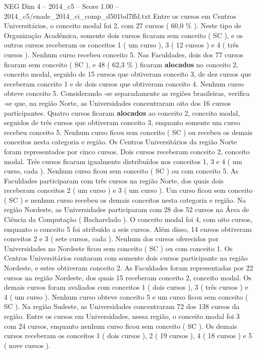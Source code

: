 \begin{textsample}{NEG Dim 4 – 2014\_c5 – Score 1.00 – 2014\_c5/enade\_2014\_ci\_comp\_d501bd7ffd.txt}
Entre os cursos em Centros Universitários, o conceito modal foi 2, com 27 cursos ( 60,0 \% ).
Neste tipo de Organização Acadêmica, somente dois cursos ficaram sem conceito ( SC ), e os outros cursos receberam os conceitos 1 ( um curso ), 3 ( 12 cursos ) e 4 ( três cursos ).
Nenhum curso recebeu conceito 5.
Nas Faculdades, dois dos 77 cursos ficaram sem conceito ( SC ), e 48 ( 62,3 \% ) ficaram \textbf{alocados} no conceito 2, conceito modal, seguido de 15 cursos que obtiveram conceito 3, de dez cursos que receberam conceito 1 e de dois cursos que obtiveram conceito 4.
Nenhum curso obteve conceito 5.
Considerando -se separadamente as regiões brasileiras, verifica -se que, na região Norte, as Universidades concentraram oito dos 16 cursos participantes.
Quatro cursos ficaram \textbf{alocados} ao conceito 2, conceito modal, seguidos de três cursos que obtiveram conceito 3, enquanto somente um curso recebeu conceito 5.
Nenhum curso ficou sem conceito ( SC ) ou recebeu os demais conceitos nesta categoria e região.
Os Centros Universitários da região Norte foram representados por cinco cursos.
Dois cursos receberam conceito 2, conceito modal.
Três cursos ficaram igualmente distribuídos nos conceitos 1, 3 e 4 ( um curso, cada ).
Nenhum curso ficou sem conceito ( SC ) ou com conceito 5.
As Faculdades participaram com três cursos na região Norte, dos quais dois receberam conceitos 2 ( um curso ) e 3 ( um curso ).
Um curso ficou sem conceito ( SC ) e nenhum curso recebeu os demais conceitos nesta categoria e região.
Na região Nordeste, as Universidades participaram com 28 dos 52 cursos na Área de Ciência da Computação ( Bacharelado ).
O conceito modal foi 4, com oito cursos, enquanto o conceito 5 foi atribuído a seis cursos.
Além disso, 14 cursos obtiveram conceitos 2 e 3 ( sete cursos, cada ).
Nenhum dos cursos oferecidos por Universidades no Nordeste ficou sem conceito ( SC ) ou com conceito 1.
Os Centros Universitários contaram com somente dois cursos participante na região Nordeste, e estes obtiveram conceito 2.
As Faculdades foram representadas por 22 cursos na região Nordeste, dos quais 15 receberam conceito 2, conceito modal.
Os demais cursos foram avaliados com conceitos 1 ( dois cursos ), 3 ( três cursos ) e 4 ( um curso ).
Nenhum curso obteve conceito 5 e um curso ficou sem conceito ( SC ).
Na região Sudeste, as Universidades concentraram 72 dos 138 cursos da região.
Entre os cursos em Universidades, nessa região, o conceito modal foi 3 com 24 cursos, enquanto nenhum curso ficou sem conceito ( SC ).
Os demais cursos receberam os conceitos 1 ( dois cursos ), 2 ( 19 cursos ), 4 ( 18 cursos ) e 5 ( nove cursos ).

\end{textsample}
